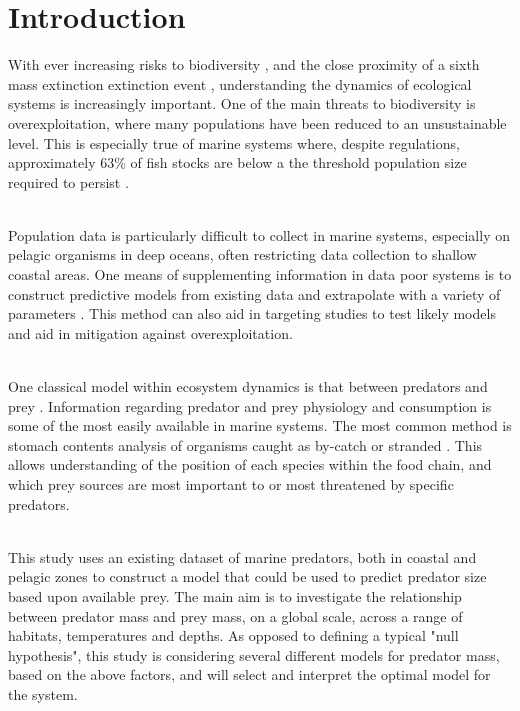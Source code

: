 \documentclass[11pt,a4paper]{article}
\begin{document}
	\section{Introduction}
	
	\par \noindent With ever increasing risks to biodiversity \citep{Kerr1995}, and the close proximity of a sixth mass extinction extinction event \citep{Barnosky2011}, understanding the dynamics of ecological systems is increasingly important. One of the main threats to biodiversity is overexploitation, where many populations have been reduced to an unsustainable level. This is especially true of marine systems where, despite regulations, approximately 63\% of fish stocks are below a the threshold population size required to persist \citep{Heithaus2008}.
	
	\par \noindent ~\\ Population data is particularly difficult to collect in marine systems, especially on pelagic organisms in deep oceans, often restricting data collection to shallow coastal areas. One means of supplementing information in data poor systems is to construct predictive models from existing data and extrapolate with a variety of parameters \citep{Levins1966}. This method can also aid in targeting studies to test likely models and aid in mitigation against overexploitation.
	
	\par \noindent ~\\ One classical model within ecosystem dynamics is that between predators and prey \citep{Freedman1983}. Information regarding predator and prey physiology and consumption is some of the most easily available in marine systems. The most common method is stomach contents analysis of organisms caught as by-catch or stranded \citep{Turesson2002}. This allows understanding of the position of each species within the food chain, and which prey sources are most important to or most threatened by specific predators. 
	
	\par \noindent ~\\ This study uses an existing dataset of marine predators, both in coastal and pelagic zones to construct a model that could be used to predict predator size based upon available prey. The main aim is to investigate the relationship between predator mass and  prey mass, on a global scale, across a range of habitats, temperatures and depths. As opposed to defining a typical "null hypothesis", this study is considering several different models for predator mass, based on the above factors, and will select and interpret the optimal model for the system.
	
\end{document}
